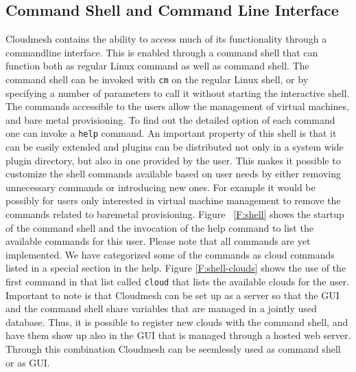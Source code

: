 \documentclass[graybox]{svmult}
\begin{document}
\subsection{Command Shell and Command Line Interface}

Cloudmesh contains the ability to access much of its functionality through a commandline interface. This is enabled through a command shell that can function both as regular Linux command as well as command shell. The command shell can be invoked with {\tt cm} on the regular Linux shell, or by specifying a number of parameters to call it without starting the interactive shell. The commands accessible to the users allow the management of virtual machines, and bare metal provisioning. To find out the detailed option of each command one can invoke a {\tt help} command. An important property of this shell is that it can be easily extended and plugins can be distributed not only in a system wide plugin directory, but also in one provided by the user. This makes it possible to customize the shell commands available based on user needs by either removing unnecessary commands or introducing new ones. For example it would be possibly for users only interested in virtual machine management to remove the commands related to baremetal provisioning. Figure ~\ref{F:shell} shows the startup of the command shell and the invocation of the help command to list the available commands for this user. Please note that all commands are yet implemented. We have categorized some of the commands as cloud commands listed in a special section in the help. Figure \ref{F:shell-clouds} shows the use of the first command in that list called {\tt cloud} that lists the available clouds for the user.  Important to note is that Cloudmesh can be set up as a server so that the GUI and the command shell share variables that are managed in a jointly used database. Thus, it is possible to register new clouds with the command shell, and have them show up also in the GUI that is managed through a hosted web server. Through this combination Cloudmesh can be seemlessly used as command shell or as GUI.
\end{document}
